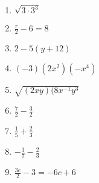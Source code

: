 \documentclass[12pt]{article}
\begin{document}
\begin{multicols}{2}
\begin{enumerate}
	\item \( \sqrt{3\cdot3^{3}} \) \\
	\item \( \frac{r}{2} - 6 = 8 \) \\
	\item \( 2 - 5(y + 12) \) \\
	\item \( (-3)(2x^{2})(-x^{4}) \) \\
	\item \( \sqrt{(2xy)(8x^{-1}y^{3}} \) \\
	\item \( \frac{7}{2} - \frac{3}{2} \) \\
	\item \( \frac{1}{5} + \frac{2}{3} \) \\
	\item \( -\frac{1}{7} - \frac{2}{3} \) \\
	\item \( \frac{3c}{2} - 3 = -6c + 6 \) \\
\end{enumerate}
\end{multicols}


\pagebreak


\large
\end{document}
